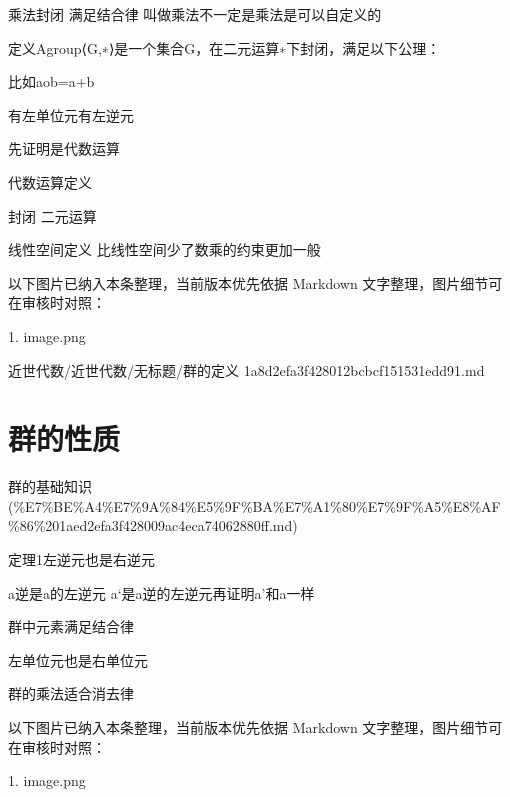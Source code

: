 \begin{definition}[群的定义]

乘法封闭 满足结合律  叫做乘法不一定是乘法是可以自定义的

定义Agroup⟨G,∗⟩是一个集合G，在二元运算∗下封闭，满足以下公理：

比如aob=a+b

有左单位元有左逆元

先证明是代数运算

代数运算定义

封闭 二元运算

线性空间定义 比线性空间少了数乘的约束更加一般

\end{definition}

\begin{note}[关联图片]
以下图片已纳入本条整理，当前版本优先依据 Markdown 文字整理，图片细节可在审核时对照：

1. image.png\\

\end{note}

\begin{note}[来源路径]

近世代数/近世代数/无标题/群的定义 1a8d2efa3f428012bcbcf151531edd91.md

\end{note}

\section*{群的性质}

\begin{note}[来源上级主题]

群的基础知识 (\%E7\%BE\%A4\%E7\%9A\%84\%E5\%9F\%BA\%E7\%A1\%80\%E7\%9F\%A5\%E8\%AF\%86\%201aed2efa3f428009ac4eca74062880ff.md)

\end{note}

\begin{note}[群的性质]

定理1左逆元也是右逆元

a逆是a的左逆元 a‘是a逆的左逆元再证明a’和a一样

群中元素满足结合律

左单位元也是右单位元

群的乘法适合消去律

\end{note}

\begin{note}[关联图片]
以下图片已纳入本条整理，当前版本优先依据 Markdown 文字整理，图片细节可在审核时对照：

1. image.png\\

\end{note}


